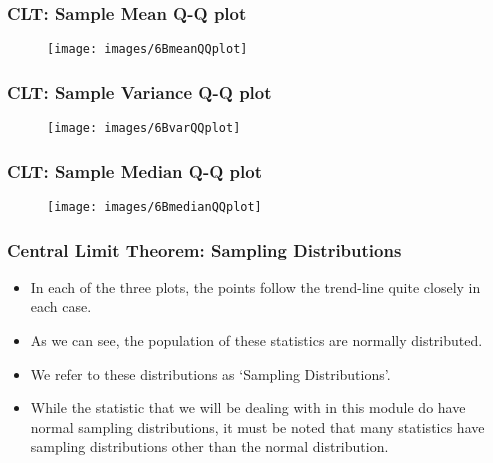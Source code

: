 \documentclass[a4]{beamer}
\begin{document}
\begin{frame}
\frametitle{CLT: Sample Mean Q-Q plot}
\begin{figure}
  \texttt{[image: images/6BmeanQQplot]}\\

\end{figure}

\end{frame}
\begin{frame}
\frametitle{CLT: Sample Variance Q-Q plot}
\begin{figure}
  \texttt{[image: images/6BvarQQplot]}\\

\end{figure}

\end{frame}
\begin{frame}
\frametitle{CLT: Sample Median Q-Q plot}
\begin{figure}
  \texttt{[image: images/6BmedianQQplot]}\\

\end{figure}
\end{frame}
\begin{frame}
\frametitle{Central Limit Theorem: Sampling Distributions}
\begin{itemize}
\item In each of the three plots, the points follow the trend-line quite closely in each case.
\item As we can see, the population of these statistics are normally distributed.
\item We refer to these distributions as `Sampling Distributions'.
\item While the statistic that we will be dealing with in this module do have normal sampling distributions, it must be noted that many statistics have sampling distributions other than the normal distribution.
\end{itemize}
\end{frame}
\end{document}
